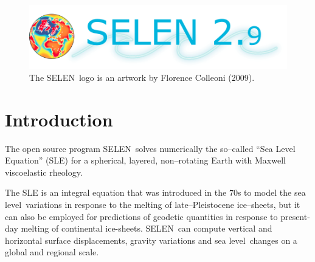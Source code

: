 \documentclass[11pt,fleqn,a4paper,titlepage]{article}
\newcommand\selen{\textsf{SELEN~}}
\newcommand\sealevel{sea level~}
\begin{document}

\maketitle

\newpage

\tableofcontents

\listoffigures

\listoftables

\clearpage 

\begin{figure}[h]
\begin{center}
\vspace{6cm}
\includegraphics[angle=0,width=1\textwidth]{./Figures/logo_SELEN29.png}
\vspace{0cm}
\caption[The \selen logo]{\small{The \selen logo is an artwork by Florence Colleoni (2009).}}
\label{fig:logo} 
\end{center} 
\end{figure}

\clearpage 

\section{Introduction}\label{introduction}

The open source program \selen solves numerically the so--called ``Sea Level Equation'' (SLE) for a spherical, layered, non--rotating Earth with Maxwell viscoelastic rheology. 

The SLE  is an integral equation that was introduced in the $70$s to model the \sealevel variations in response to the melting of late--Pleistocene ice--sheets, but it can also be employed for predictions of geodetic quantities in response to present-day melting of continental ice-sheets. \selen can compute vertical and horizontal surface displacements, gravity variations and \sealevel changes on a global and regional scale. 
\end{document}
